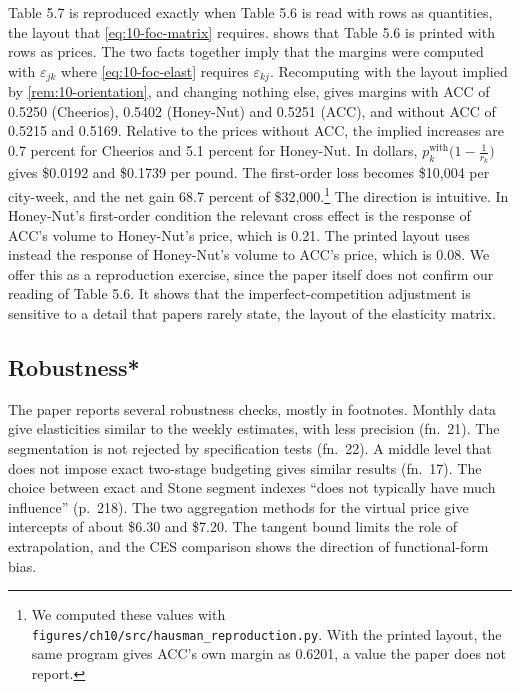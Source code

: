 \begin{remark}\label{rem:10-margins-orientation}
Table 5.7 is reproduced exactly when Table 5.6 is read with rows as quantities, the layout that
\eqref{eq:10-foc-matrix} requires.  shows that Table 5.6 is printed with rows as
prices. The two facts together imply that the margins were computed with $\varepsilon_{jk}$ where
\eqref{eq:10-foc-elast} requires $\varepsilon_{kj}$. Recomputing with the layout implied by
\cref{rem:10-orientation}, and changing nothing else, gives margins with ACC of 0.5250 (Cheerios), 0.5402
(Honey-Nut) and 0.5251 (ACC), and without ACC of 0.5215 and 0.5169. Relative to the prices without ACC,
the implied increases are 0.7 percent for Cheerios and 5.1 percent for Honey-Nut. In dollars,
$p_k^{\text{with}}\bigl(1 - \frac{1}{r_k}\bigr)$ gives \$0.0192 and \$0.1739 per pound. The first-order loss becomes
\$10,004 per city-week, and the net gain 68.7 percent of \$32,000.\footnote{We computed these values with
\texttt{figures/ch10/src/hausman\_reproduction.py}. With the printed layout, the same program gives ACC's own
margin as 0.6201, a value the paper does not report.} The direction is intuitive. In Honey-Nut's first-order
condition the relevant cross effect is the response of ACC's volume to Honey-Nut's price, which is 0.21. The
printed layout uses instead the response of Honey-Nut's volume to ACC's price, which is 0.08. We offer this
as a reproduction exercise, since the paper itself does not confirm our reading of Table 5.6. It shows that
the imperfect-competition adjustment is sensitive to a detail that papers rarely state, the layout of the
elasticity matrix.
\end{remark}

\subsection{Robustness*}\label{sec:10-hausman-robustness}

The paper reports several robustness checks, mostly in footnotes. Monthly data give elasticities similar to
the weekly estimates, with less precision (fn.~21). The segmentation is not rejected by specification tests
(fn.~22). A middle level that does not impose exact two-stage budgeting gives similar results (fn.~17). The
choice between exact and Stone segment indexes ``does not typically have much influence'' (p.~218). The two
aggregation methods for the virtual price give intercepts of about \$6.30 and \$7.20. The tangent bound
limits the role of extrapolation, and the CES comparison shows the direction of functional-form bias.

